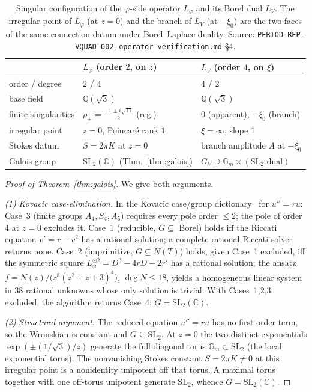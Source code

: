 \documentclass[11pt,reqno]{amsart}
\theoremstyle{plain}
\theoremstyle{definition}
\newcommand{\Lphi}{L_{\varphi}}
\newcommand{\LV}{L_{V}}
\newcommand{\Qsqrt}{\mathbb{Q}(\sqrt3)}
\newcommand{\xizero}{\xi_0}
\newcommand{\SL}{\mathrm{SL}}
\newcommand{\Gm}{\mathbb{G}_m}
\begin{document}
\begin{table}[h]
\centering
\begin{tabular}{@{}lll@{}}
\toprule
 & $\Lphi$ (order $2$, on $z$) & $\LV$ (order $4$, on $\xi$) \\
\midrule
order / degree & $2$ / $4$ & $4$ / $2$ \\
base field & $\Qsqrt$ & $\Qsqrt$ \\
finite singularities & $\rho_\pm=\tfrac{-1\pm i\sqrt{11}}2$ (reg.) & $0$ (apparent), $-\xizero$ (branch) \\
irregular point & $z=0$, Poincar\'e rank $1$ & $\xi=\infty$, slope $1$ \\
Stokes datum & $S=2\pi K$ at $z=0$ & branch amplitude $A$ at $-\xizero$ \\
Galois group & $\SL_2(\mathbb{C})$ (Thm.~\ref{thm:galois}) & $G_V\supseteq\Gm\times(\SL_2\text{-dual})$ \\
\bottomrule
\end{tabular}
\caption{Singular configuration of the $\varphi$-side operator $\Lphi$ and its Borel dual $\LV$.
The irregular point of $\Lphi$ (at $z=0$) and the branch of $\LV$ (at $-\xizero$) are the two
faces of the same connection datum under Borel--Laplace duality. Source:
\texttt{PERIOD-REP-VQUAD-002}, \texttt{operator-verification.md} \S4.}
\label{tab:config}
\end{table}

\begin{proof}[Proof of Theorem~\ref{thm:galois}]
We give both arguments.

\emph{(1) Kovacic case-elimination.} In the Kovacic case/group
dictionary~\cite{Kovacic,vdPS} for $u''=ru$: Case~3 (finite groups $A_4,S_4,A_5$) requires every
pole order $\le2$; the pole of order $4$ at $z=0$ excludes it. Case~1 (reducible, $G\subseteq$
Borel) holds iff the Riccati equation $v'=r-v^2$ has a rational solution; a complete rational
Riccati solver returns none. Case~2 (imprimitive, $G\subseteq N(T)$) holds, given Case~1
excluded, iff the symmetric square $\Lphi^{\odot2}=D^3-4rD-2r'$ has a rational solution; the
ansatz $f=N(z)/\bigl(z^8(z^2+z+3)^4\bigr)$, $\deg N\le18$, yields a homogeneous linear system in
$38$ rational unknowns whose only solution is trivial. With Cases~1,2,3 excluded, the algorithm
returns Case~4: $G=\SL_2(\mathbb{C})$.

\emph{(2) Structural argument.} The reduced equation $u''=ru$ has no first-order term, so the
Wronskian is constant and $G\subseteq\SL_2$. At $z=0$ the two distinct exponentials
$\exp(\pm(1/\sqrt3)/z)$ generate the full diagonal torus $\mathbb{G}_m\subset\SL_2$ (the local
exponential torus). The nonvanishing Stokes constant $S=2\pi K\ne0$ at this irregular point is a
nonidentity unipotent off that torus. A maximal torus together with one off-torus unipotent
generate $\SL_2$, whence $G=\SL_2(\mathbb{C})$.
\end{proof}
\end{document}
